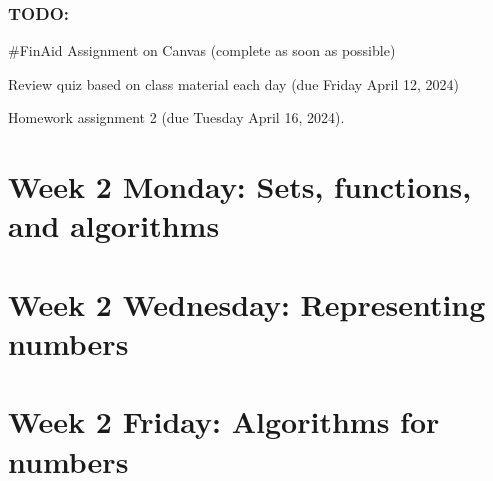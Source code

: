 \subsubsection*{TODO:}
\begin{list}
   {\itemsep2pt}
   \item \#FinAid Assignment on Canvas (complete as soon as possible) 
   \item Review quiz based on class material each day (due Friday April 12, 2024)
   \item Homework assignment 2 (due Tuesday April 16, 2024).
\end{list}

\newpage

\section*{Week 2 Monday: Sets, functions, and algorithms}

\newpage



\section*{Week 2 Wednesday: Representing numbers}


\vfill
\newpage





\newpage
\section*{Week 2 Friday: Algorithms for numbers}





%
\newpage


\newpage

\newpage
